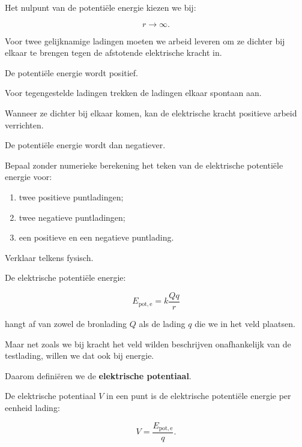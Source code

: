 \documentclass{ximera}
\begin{document}

Het nulpunt van de potentiële energie kiezen we bij:

\[
r\rightarrow\infty.
\]

Voor twee gelijknamige ladingen moeten we arbeid leveren om ze dichter
bij elkaar te brengen tegen de afstotende elektrische kracht in.

De potentiële energie wordt positief.

Voor tegengestelde ladingen trekken de ladingen elkaar spontaan aan.

Wanneer ze dichter bij elkaar komen, kan de elektrische kracht
positieve arbeid verrichten.

De potentiële energie wordt dan negatiever.


\begin{oefening}{\oefU\ESS}

Bepaal zonder numerieke berekening het teken van de elektrische
potentiële energie voor:

\begin{enumerate}
  \item twee positieve puntladingen;
  \item twee negatieve puntladingen;
  \item een positieve en een negatieve puntlading.
\end{enumerate}

Verklaar telkens fysisch.

\end{oefening}




De elektrische potentiële energie:

\[
E_{\mathrm{pot,e}}
=
k\frac{Qq}{r}
\]

hangt af van zowel de bronlading $Q$ als de lading $q$ die we in het
veld plaatsen.

Maar net zoals we bij kracht het veld wilden beschrijven onafhankelijk
van de testlading, willen we dat ook bij energie.

Daarom definiëren we de \textbf{elektrische potentiaal}.


\begin{definitie}

De elektrische potentiaal $V$ in een punt is de elektrische potentiële
energie per eenheid lading:

\[
\boxed{
V
=
\frac{E_{\mathrm{pot,e}}}{q}.
}
\]

\end{definitie}
\end{document}
